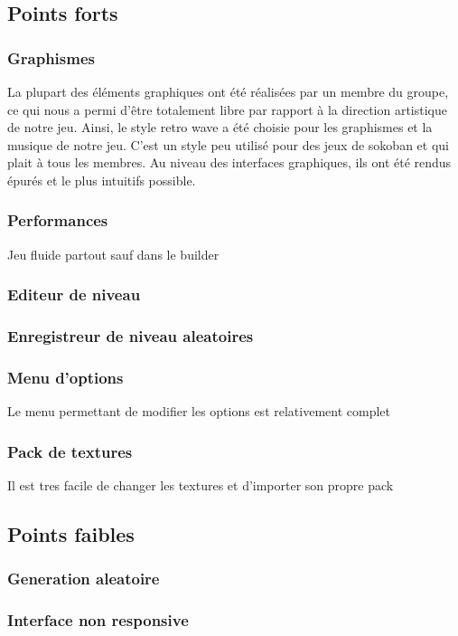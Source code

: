 \documentclass[../main.tex]{subfiles}
\begin{document}
\subsection{Points forts}
\subsubsection{Graphismes}
La plupart des éléments graphiques ont été réalisées par un membre du groupe, ce qui nous a permi d'être totalement libre
par rapport à la direction artistique de notre jeu.
Ainsi, le style retro wave a été choisie pour les graphismes et la musique de notre jeu.
C'est un style peu utilisé pour des jeux de sokoban et qui plait à tous les membres.
Au niveau des interfaces graphiques, ils ont été rendus épurés et le plus intuitifs possible.	

\subsubsection{Performances}
Jeu fluide partout sauf dans le builder
\subsubsection{Editeur de niveau}
\subsubsection{Enregistreur de niveau aleatoires}
\subsubsection{Menu d'options}
Le menu permettant de modifier les options est relativement complet
\subsubsection{Pack de textures}
Il est tres facile de changer les textures et d'importer son propre pack

\subsection{Points faibles}
\subsubsection{Generation aleatoire}
\subsubsection{Interface non responsive}
\end{document}
